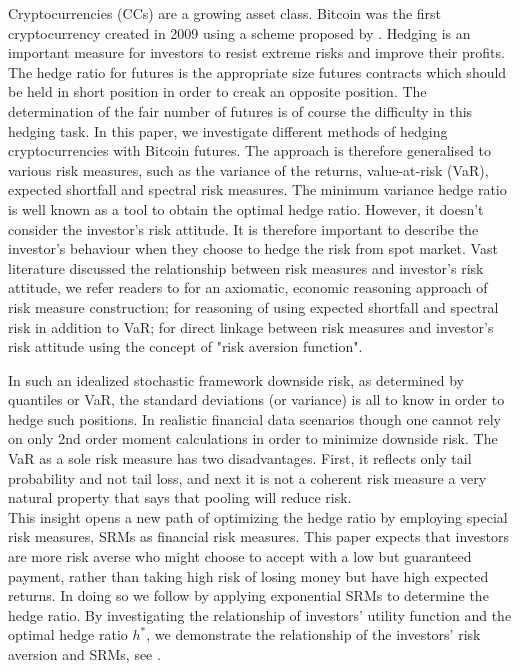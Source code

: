 \documentclass[11pt,a4paper,english]{article}
\begin{document}
Cryptocurrencies (CCs) are a growing asset class.
Bitcoin was the first cryptocurrency created in 2009 using a scheme proposed by \citet{nakamoto2019bitcoin}.
Hedging is an important measure for investors to resist extreme risks and improve their profits.
The hedge ratio for futures is the appropriate size futures contracts which should be held in short position
in order to creak an opposite position.
The determination of the fair number of futures is of course the difficulty in this hedging task.
In this paper, we investigate different methods of hedging cryptocurrencies with Bitcoin futures.
The approach is therefore generalised to various risk measures, such as the variance of the returns,
value-at-risk (VaR), expected shortfall and spectral risk measures.
The minimum variance hedge ratio is well known as a tool to obtain the optimal hedge ratio.
However, it doesn't consider the investor's risk attitude.
It is therefore important to describe the investor's behaviour when they choose to hedge the risk from spot market.
Vast literature discussed the relationship between risk measures and investor's risk attitude, we refer readers to
\citet{artzner1999coherent} for an axiomatic, economic reasoning approach of risk measure construction;
\citet{embrechts2002correlation} for reasoning of using expected shortfall and spectral risk in addition to VaR;
\citet{Acerbi2002} for direct linkage between risk measures and investor's risk attitude using the concept of "risk aversion function".

In such an idealized stochastic framework downside risk, as determined by quantiles or VaR,
the standard deviations (or variance) is all to know in order to hedge such positions.
In realistic financial data scenarios though one cannot rely on only 2nd order moment calculations in order to minimize downside risk.
The VaR as a sole risk measure has two disadvantages.
First, it reflects only tail probability and not tail loss, and next it is not a coherent risk measure a very natural property that says that pooling will reduce risk. \\

This insight opens a new path of optimizing the hedge ratio by employing special risk measures, SRMs as financial risk measures.
This paper expects that investors are more risk averse who might choose to accept with a low but guaranteed payment,
rather than taking high risk of losing money but have high expected returns.
In doing so we follow \citet{barbi2014copula} by applying exponential SRMs to determine the hedge ratio.
By investigating the relationship of investors' utility function and the optimal hedge ratio $h^\ast$, we demonstrate the relationship of the investors' risk aversion and SRMs, see \citet{brandtner2015decision}.\\
\end{document}

